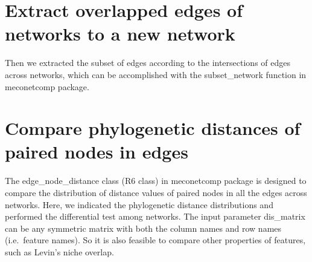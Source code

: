 \documentclass[
]{book}
\newenvironment{Shaded}{\begin{snugshade}}{\end{snugshade}}
\newcommand{\AttributeTok}[1]{\textcolor[rgb]{0.77,0.63,0.00}{#1}}
\newcommand{\CommentTok}[1]{\textcolor[rgb]{0.56,0.35,0.01}{\textit{#1}}}
\newcommand{\FunctionTok}[1]{\textcolor[rgb]{0.00,0.00,0.00}{#1}}
\newcommand{\NormalTok}[1]{#1}
\newcommand{\OtherTok}[1]{\textcolor[rgb]{0.56,0.35,0.01}{#1}}
\newcommand{\SpecialCharTok}[1]{\textcolor[rgb]{0.00,0.00,0.00}{#1}}
\newcommand{\StringTok}[1]{\textcolor[rgb]{0.31,0.60,0.02}{#1}}
\begin{document}
\hypertarget{extract-overlapped-edges-of-networks-to-a-new-network}{%
\section{Extract overlapped edges of networks to a new network}\label{extract-overlapped-edges-of-networks-to-a-new-network}}

Then we extracted the subset of edges according to the intersections of edges across networks,
which can be accomplished with the subset\_network function in meconetcomp package.

\begin{Shaded}
\end{Shaded}

\hypertarget{compare-phylogenetic-distances-of-paired-nodes-in-edges}{%
\section{Compare phylogenetic distances of paired nodes in edges}\label{compare-phylogenetic-distances-of-paired-nodes-in-edges}}

The edge\_node\_distance class (R6 class) in meconetcomp package is designed to compare the distribution of distance values of paired nodes in all the edges across networks.
Here, we indicated the phylogenetic distance distributions and performed the differential test among networks.
The input parameter dis\_matrix can be any symmetric matrix with both the column names and row names (i.e.~feature names).
So it is also feasible to compare other properties of features, such as Levin's niche overlap.
\end{document}
